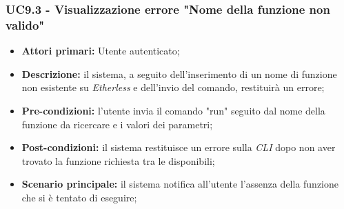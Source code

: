 \subsubsection{UC9.3 - Visualizzazione errore "Nome della funzione non valido"}
\begin{itemize}
	\item \textbf{Attori primari:} Utente autenticato;
	\item \textbf{Descrizione:} il sistema, a seguito dell'inserimento di un nome di funzione non esistente su \textit{Etherless} e dell'invio del comando, restituirà un errore; 
	\item \textbf{Pre-condizioni:} l'utente invia il comando "run" seguito dal nome della funzione da ricercare e i valori dei parametri;
	\item \textbf{Post-condizioni:} il sistema restituisce un errore sulla \textit{CLI\glo} dopo non aver trovato la funzione richiesta tra le disponibili;
	\item \textbf{Scenario principale:} il sistema notifica all'utente l'assenza della funzione che si è tentato di eseguire;
\end{itemize}